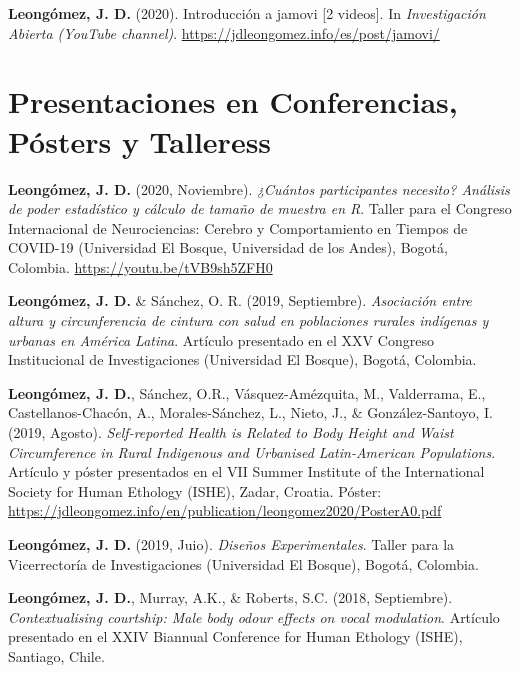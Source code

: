 \documentclass[11pt, a4paper]{awesome-cv}
\begin{document}
\leavevmode\hypertarget{ref-leongomezIntroduccionJamovi2020}{}%
\textbf{Leongómez, J. D.} (2020). {Introducción a jamovi {[}2
videos{]}}. In \emph{{Investigación Abierta (YouTube channel)}}.
\url{https://jdleongomez.info/es/post/jamovi/}

\endgroup

\hypertarget{presentaciones-en-conferencias-puxf3sters-y-talleress}{%
\section{Presentaciones en Conferencias, Pósters y
Talleress}\label{presentaciones-en-conferencias-puxf3sters-y-talleress}}

\begingroup
\setlength{\parindent}{-0.5in}
\setlength{\leftskip}{0.5in}

\textbf{Leongómez, J. D.} (2020, Noviembre). \emph{¿Cuántos
participantes necesito? Análisis de poder estadístico y cálculo de
tamaño de muestra en R}. Taller para el Congreso Internacional de
Neurociencias: Cerebro y Comportamiento en Tiempos de COVID-19
(Universidad El Bosque, Universidad de los Andes), Bogotá, Colombia.
\url{https://youtu.be/tVB9sh5ZFH0}

\textbf{Leongómez, J. D.} \& Sánchez, O. R. (2019, Septiembre).
\emph{Asociación entre altura y circunferencia de cintura con salud en
poblaciones rurales indígenas y urbanas en América Latina}. Artículo
presentado en el XXV Congreso Institucional de Investigaciones
(Universidad El Bosque), Bogotá, Colombia.

\textbf{Leongómez, J. D.}, Sánchez, O.R., Vásquez-Amézquita, M.,
Valderrama, E., Castellanos-Chacón, A., Morales-Sánchez, L., Nieto, J.,
\& González-Santoyo, I. (2019, Agosto). \emph{Self-reported Health is
Related to Body Height and Waist Circumference in Rural Indigenous and
Urbanised Latin-American Populations}. Artículo y póster presentados en
el VII Summer Institute of the International Society for Human Ethology
(ISHE), Zadar, Croatia. Póster:
\url{https://jdleongomez.info/en/publication/leongomez2020/PosterA0.pdf}

\textbf{Leongómez, J. D.} (2019, Juio). \emph{Diseños Experimentales}.
Taller para la Vicerrectoría de Investigaciones (Universidad El Bosque),
Bogotá, Colombia.

\textbf{Leongómez, J. D.}, Murray, A.K., \& Roberts, S.C. (2018,
Septiembre). \emph{Contextualising courtship: Male body odour effects on
vocal modulation}. Artículo presentado en el XXIV Biannual Conference
for Human Ethology (ISHE), Santiago, Chile.
\end{document}
